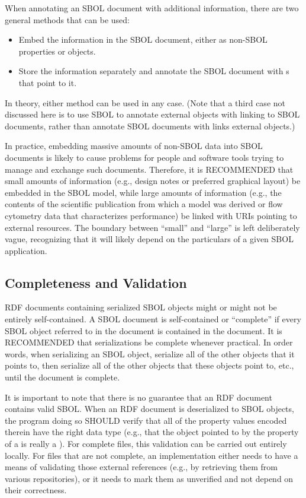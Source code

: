 When annotating an SBOL document with additional information, there are
two general methods that can be used:
\begin{itemize}
\item Embed the information in the SBOL document, either as non-SBOL
  properties or  objects.
\item Store the information separately and annotate the SBOL document
  with s that point to it.
\end{itemize}
In theory, either method can be used in any case. (Note that a third case not
discussed here is to use SBOL to annotate external objects with linking
to SBOL documents, rather than annotate SBOL documents with links external objects.)

In practice, 
embedding massive amounts of non-SBOL data into SBOL documents is likely
to cause problems for people and software tools trying to manage and
exchange such documents.  Therefore, it is RECOMMENDED that small amounts of information (e.g., design notes or preferred graphical layout) be embedded in the SBOL model, while large amounts of information (e.g., the contents of the scientific publication from which a model was derived or flow cytometry data that characterizes performance) be linked with URIs pointing to external resources.  The boundary between ``small'' and ``large'' is left deliberately vague, recognizing that it will likely depend on the particulars of a given SBOL application.

\subsection{Completeness and Validation}

RDF documents containing serialized SBOL objects might or might not be
entirely self-contained.  A SBOL document is self-contained or ``complete'' if every SBOL object referred to in the document is contained in the document.  It is RECOMMENDED that serializations be complete whenever practical.  In order words, when serializing an SBOL object, serialize all of the other objects that it points to, then serialize all of the other objects that these objects point to, etc., until the document is complete.

It is important to note that there is no guarantee that an RDF document
contains valid SBOL. When an RDF document is deserialized to SBOL
objects, the program doing so SHOULD verify that all of the property
values encoded therein have the right data type (e.g., that the object
pointed to by the  property of a
 is really a ).
For complete files, this validation can be carried out entirely locally. For files that are not complete, an implementation either needs to
have a means of validating those external references (e.g., by
retrieving them from various repositories), or it needs to mark them as
unverified and not depend on their correctness.

